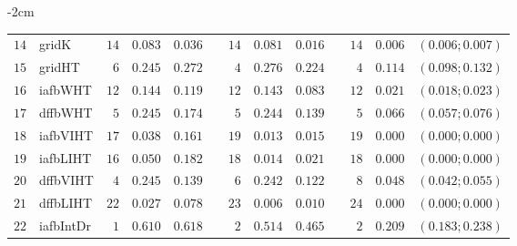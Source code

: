 \begin{table*}[!htbp]
\begin{adjustwidth*}{}{-2cm}
\begin{tabular}{@{}rlrrrrrrrrrcc@{}}
\footnotesize{$14$} & \footnotesize{gridK    } & \footnotesize{$14$} & \footnotesize{$0.083$} & \footnotesize{$0.036$} && \footnotesize{$14$} & \footnotesize{$0.081$} & \footnotesize{$0.016$} && \footnotesize{$14$} & \footnotesize{$0.006$} & \footnotesize{$(0.006;0.007)$} \\
\footnotesize{$15$} & \footnotesize{gridHT   } & \footnotesize{$6 $} & \footnotesize{$0.245$} & \footnotesize{$0.272$} && \footnotesize{$4 $} & \footnotesize{$0.276$} & \footnotesize{$0.224$} && \footnotesize{$4 $} & \footnotesize{$0.114$} & \footnotesize{$(0.098;0.132)$} \\
\footnotesize{$16$} & \footnotesize{iafbWHT  } & \footnotesize{$12$} & \footnotesize{$0.144$} & \footnotesize{$0.119$} && \footnotesize{$12$} & \footnotesize{$0.143$} & \footnotesize{$0.083$} && \footnotesize{$12$} & \footnotesize{$0.021$} & \footnotesize{$(0.018;0.023)$} \\
\footnotesize{$17$} & \footnotesize{dffbWHT  } & \footnotesize{$5 $} & \footnotesize{$0.245$} & \footnotesize{$0.174$} && \footnotesize{$5 $} & \footnotesize{$0.244$} & \footnotesize{$0.139$} && \footnotesize{$5 $} & \footnotesize{$0.066$} & \footnotesize{$(0.057;0.076)$} \\
\footnotesize{$18$} & \footnotesize{iafbVIHT } & \footnotesize{$17$} & \footnotesize{$0.038$} & \footnotesize{$0.161$} && \footnotesize{$19$} & \footnotesize{$0.013$} & \footnotesize{$0.015$} && \footnotesize{$19$} & \footnotesize{$0.000$} & \footnotesize{$(0.000;0.000)$} \\
\footnotesize{$19$} & \footnotesize{iafbLIHT } & \footnotesize{$16$} & \footnotesize{$0.050$} & \footnotesize{$0.182$} && \footnotesize{$18$} & \footnotesize{$0.014$} & \footnotesize{$0.021$} && \footnotesize{$18$} & \footnotesize{$0.000$} & \footnotesize{$(0.000;0.000)$} \\
\footnotesize{$20$} & \footnotesize{dffbVIHT } & \footnotesize{$4 $} & \footnotesize{$0.245$} & \footnotesize{$0.139$} && \footnotesize{$6 $} & \footnotesize{$0.242$} & \footnotesize{$0.122$} && \footnotesize{$8 $} & \footnotesize{$0.048$} & \footnotesize{$(0.042;0.055)$} \\
\footnotesize{$21$} & \footnotesize{dffbLIHT } & \footnotesize{$22$} & \footnotesize{$0.027$} & \footnotesize{$0.078$} && \footnotesize{$23$} & \footnotesize{$0.006$} & \footnotesize{$0.010$} && \footnotesize{$24$} & \footnotesize{$0.000$} & \footnotesize{$(0.000;0.000)$} \\
\footnotesize{$22$} & \footnotesize{iafbIntDr} & \footnotesize{$1 $} & \footnotesize{$0.610$} & \footnotesize{$0.618$} && \footnotesize{$2 $} & \footnotesize{$0.514$} & \footnotesize{$0.465$} && \footnotesize{$2 $} & \footnotesize{$0.209$} & \footnotesize{$(0.183;0.238)$} \\

\end{tabular}
\end{adjustwidth*}
\end{table*}

